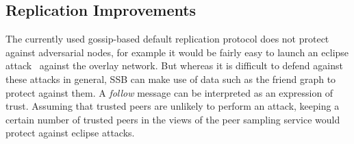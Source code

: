 \documentclass[10pt,sigconf]{acmart}
\begin{document}




\subsection{Replication Improvements}

The currently used gossip-based default replication protocol does not protect against adversarial nodes, for example it would be fairly easy to launch an eclipse attack~\cite{singh2006eclipse} against the overlay network. But whereas it is difficult to defend against these attacks in general, SSB can make use of data such as the friend graph to protect against them. A \textit{follow} message can be interpreted as an expression of trust. Assuming that trusted peers are unlikely to perform an attack, keeping a certain number of trusted peers in the views of the peer sampling service would protect against eclipse attacks.
\end{document}

